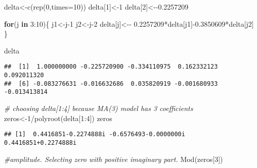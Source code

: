 \documentclass[
]{article}
\newenvironment{Shaded}{\begin{snugshade}}{\end{snugshade}}
\newcommand{\AttributeTok}[1]{\textcolor[rgb]{0.77,0.63,0.00}{#1}}
\newcommand{\CommentTok}[1]{\textcolor[rgb]{0.56,0.35,0.01}{\textit{#1}}}
\newcommand{\ControlFlowTok}[1]{\textcolor[rgb]{0.13,0.29,0.53}{\textbf{#1}}}
\newcommand{\DecValTok}[1]{\textcolor[rgb]{0.00,0.00,0.81}{#1}}
\newcommand{\FloatTok}[1]{\textcolor[rgb]{0.00,0.00,0.81}{#1}}
\newcommand{\FunctionTok}[1]{\textcolor[rgb]{0.00,0.00,0.00}{#1}}
\newcommand{\NormalTok}[1]{#1}
\newcommand{\OtherTok}[1]{\textcolor[rgb]{0.56,0.35,0.01}{#1}}
\newcommand{\SpecialCharTok}[1]{\textcolor[rgb]{0.00,0.00,0.00}{#1}}
\begin{document}
\begin{Shaded}
\begin{Highlighting}[]
\NormalTok{delta}\OtherTok{\textless{}{-}}\FunctionTok{c}\NormalTok{(}\FunctionTok{rep}\NormalTok{(}\DecValTok{0}\NormalTok{,}\AttributeTok{times=}\DecValTok{10}\NormalTok{))}
\NormalTok{delta[}\DecValTok{1}\NormalTok{]}\OtherTok{\textless{}{-}}\DecValTok{1}
\NormalTok{delta[}\DecValTok{2}\NormalTok{]}\OtherTok{\textless{}{-}}\SpecialCharTok{{-}}\FloatTok{0.2257209}

\ControlFlowTok{for}\NormalTok{(j }\ControlFlowTok{in} \DecValTok{3}\SpecialCharTok{:}\DecValTok{10}\NormalTok{)\{}
\NormalTok{j1}\OtherTok{\textless{}{-}}\NormalTok{j}\DecValTok{{-}1}
\NormalTok{j2}\OtherTok{\textless{}{-}}\NormalTok{j}\DecValTok{{-}2}
\NormalTok{delta[j]}\OtherTok{\textless{}{-}}\SpecialCharTok{{-}} \FloatTok{0.2257209}\SpecialCharTok{*}\NormalTok{delta[j1]}\SpecialCharTok{{-}}\FloatTok{0.3850609}\SpecialCharTok{*}\NormalTok{delta[j2]}
\NormalTok{\}}

\NormalTok{delta}
\end{Highlighting}
\end{Shaded}

\begin{verbatim}
##  [1]  1.000000000 -0.225720900 -0.334110975  0.162332123  0.092011320
##  [6] -0.083276631 -0.016632686  0.035820919 -0.001680933 -0.013413814
\end{verbatim}

\begin{Shaded}
\begin{Highlighting}[]
\CommentTok{\# choosing delta[1:4] because MA(3) model has 3 coefficients}
\NormalTok{zeros}\OtherTok{\textless{}{-}}\DecValTok{1}\SpecialCharTok{/}\FunctionTok{polyroot}\NormalTok{(delta[}\DecValTok{1}\SpecialCharTok{:}\DecValTok{4}\NormalTok{])}
\NormalTok{zeros}
\end{Highlighting}
\end{Shaded}

\begin{verbatim}
## [1]  0.4416851-0.2274888i -0.6576493-0.0000000i  0.4416851+0.2274888i
\end{verbatim}

\begin{Shaded}
\begin{Highlighting}[]
\CommentTok{\#amplitude. Selecting zero with positive imaginary part.}
\FunctionTok{Mod}\NormalTok{(zeros[}\DecValTok{3}\NormalTok{])}
\end{Highlighting}
\end{Shaded}
\end{document}
